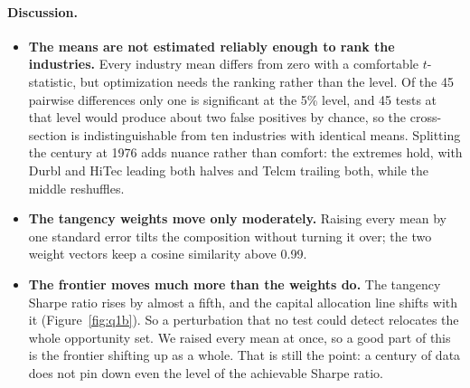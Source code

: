 \documentclass[11pt]{article}
\begin{document}
\paragraph{Discussion.}
\begin{itemize}
\setlength{\itemsep}{3pt}\setlength{\parskip}{0pt}

\item \textbf{The means are not estimated reliably enough to rank the
industries.} Every industry mean differs from zero with a comfortable
$t$-statistic, but optimization needs the ranking rather than the level. Of
the 45 pairwise differences only one is significant at the 5\% level, and 45
tests at that level would produce about two false positives by chance, so the
cross-section is indistinguishable from ten industries with identical means.
Splitting the century at 1976 adds nuance rather than comfort: the extremes
hold, with Durbl and HiTec leading both halves and Telcm trailing both, while
the middle reshuffles.

\item \textbf{The tangency weights move only moderately.} Raising every mean
by one standard error tilts the composition without turning it over; the two
weight vectors keep a cosine similarity above 0.99.

\item \textbf{The frontier moves much more than the weights do.} The tangency
Sharpe ratio rises by almost a fifth, and the capital allocation line shifts
with it (Figure~\ref{fig:q1b}). So a perturbation that no test could detect
relocates the whole opportunity set. We raised every mean at once, so a good
part of this is the frontier shifting up as a whole. That is still the point:
a century of data does not pin down even the level of the achievable Sharpe
ratio.

\end{itemize}
\end{document}
